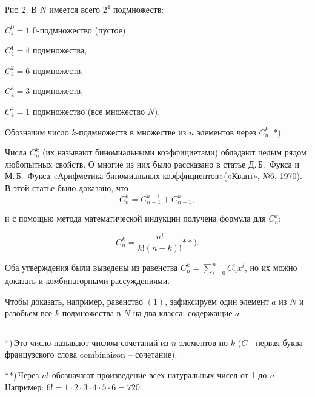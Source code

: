 \documentclass[11pt, a4paper, twocolumn]{report}
\begin{document}
	
\begin{footnotesize}
\noindent Рис.\,2. В $N$ имеется всего $2^4$ подмножеств:

\noindent$C^0_4 = 1$ 0-подмножество (пустое)
 
\vspace{4mm}
\noindent $C^1_4 = 4$ подмножества,

\vspace{10mm}
\noindent $C^2_4 = 6$  подмножеств,

\vspace{13mm}
\noindent $C^3_4 = 3$ подмножеств,

\vspace{10mm}
\noindent $C^4_4 = 1$ подмножество (все множество $N$).
\end{footnotesize}
\vspace{5mm}

Обозначим число $k$-подмножеств в множестве из $n$ элементов через $C^k_n$~*).

Числа $C^k_n$ (их называют биномиальными коэффициетами) обладают целым рядом любопытных свойств. О многие из них было рассказано в статье Д.\,Б.~Фукса и М.\,Б.~Фукса «Арифметика биномиальных коэффициентов»(«Квант», №6, 1970). В этой статье было доказано, что 
\begin{equation}
	C^k_n = C^{k-1}_{n-1} + C^k_{n-1},
\end{equation}

\noindent и с помощью метода математической индукции получена формула для $C^k_n$:

\begin{equation}
	C^k_n = \frac{n!}{k!(n - k)!}{\ast\ast}).
\end{equation}

Оба утверждения были выведены из равенства $ C^k_n = \sum^{n}_{i=0}C^i_nx^i $, но их можно доказать и комбинаторными рассуждениями.

Чтобы доказать, например, равенство $ (1) $, зафиксируем один элемент $a$ из $ N $ и разобьем все $ k $-подмножества в $ N $ на два класса: содержащие $a$

\noindent\rule{1.8cm}{1px}
\vspace{2mm}

\begin{footnotesize}
*)\,Это число называют числом сочетаний из $ n $ элементов по $ k $ ($ C $ - первая буква французского слова combinaison -- сочетание).

**)\,Через $n!$ обозначают произведение всех натуральных чисел от 1 до $ n $. Например: $ 6!= 1\cdot2\cdot3\cdot4\cdot5\cdot6=720. $
\end{footnotesize}
\end{document}
